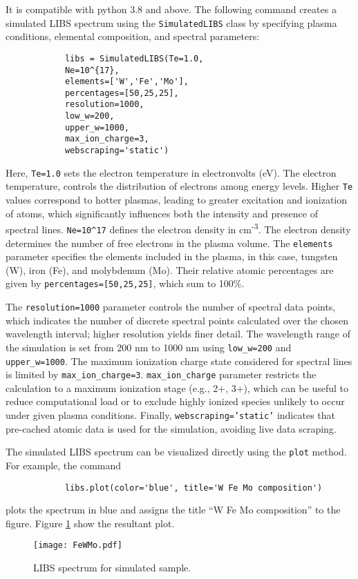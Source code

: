 \documentclass[12pt,a4paper]{article}
\begin{document}
		It is compatible with python 3.8 and above. The following command creates a simulated LIBS spectrum using the \texttt{SimulatedLIBS} class by specifying plasma conditions, elemental composition, and spectral parameters:
		\vspace{-0.5em}
		\begin{verbatim}
			libs = SimulatedLIBS(Te=1.0,
			Ne=10^{17},
			elements=['W','Fe','Mo'],
			percentages=[50,25,25],
			resolution=1000,
			low_w=200,
			upper_w=1000,
			max_ion_charge=3,
			webscraping='static')
		\end{verbatim}
		\vspace{-1.5em}
		
		Here, \texttt{Te=1.0} sets the electron temperature in electronvolts (eV). The electron temperature, controls the distribution of electrons among energy levels. Higher \texttt{Te} values correspond to hotter plasmas, leading to greater excitation and ionization of atoms, which significantly influences both the intensity and presence of spectral lines. \texttt{Ne=10\textasciicircum17} defines the electron density in cm\textsuperscript{-3}. The electron density  determines the number of free electrons in the plasma volume. The \texttt{elements} parameter specifies the elements included in the plasma, in this case, tungsten (W), iron (Fe), and molybdenum (Mo). Their relative atomic percentages are given by \texttt{percentages=[50,25,25]}, which sum to 100\%.
		
		The \texttt{resolution=1000} parameter controls the number of spectral data points, which indicates the number of discrete spectral points calculated over the chosen wavelength interval; higher resolution yields finer detail. The wavelength range of the simulation is set from 200 nm to 1000 nm using \texttt{low\_w=200} and \texttt{upper\_w=1000}. The maximum ionization charge state considered for spectral lines is limited by \texttt{max\_ion\_charge=3}. \texttt{max\_ion\_charge} parameter restricts the calculation to a maximum ionization stage (e.g., 2+, 3+), which can be useful to reduce computational load or to exclude highly ionized species unlikely to occur under given plasma conditions. Finally, \texttt{webscraping='static'} indicates that pre-cached atomic data is used for the simulation, avoiding live data scraping.
		
		The simulated LIBS spectrum can be visualized directly using the \texttt{plot} method. For example, the command
		
		\vspace{-0.5em}
		\begin{verbatim}
			libs.plot(color='blue', title='W Fe Mo composition')
		\end{verbatim}
		\vspace{-1.5em}
		plots the spectrum in blue and assigns the title ``W Fe Mo composition'' to the figure. Figure \ref*{fig:libs-spectrum-FeWMo} show the resultant plot.
		\begin{figure}[h!]
			\centering
			\texttt{[image: FeWMo.pdf]}
			\caption{LIBS spectrum for simulated sample.}
			\label{fig:libs-spectrum-FeWMo}
		\end{figure}
		
\end{document}
